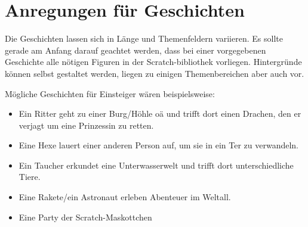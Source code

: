 \section{Anregungen für
Geschichten}\label{anregungen-fuxfcr-geschichten}

Die Geschichten lassen sich in Länge und Themenfeldern variieren. Es
sollte gerade am Anfang darauf geachtet werden, dass bei einer
vorgegebenen Geschichte alle nötigen Figuren in der Scratch-bibliothek
vorliegen. Hintergründe können selbst gestaltet werden, liegen zu
einigen Themenbereichen aber auch vor.

Mögliche Geschichten für Einsteiger wären beispielsweise:

\begin{itemize}
\item
  Ein Ritter geht zu einer Burg/Höhle oä und trifft dort einen Drachen,
  den er verjagt um eine Prinzessin zu retten.
\item
  Eine Hexe lauert einer anderen Person auf, um sie in ein Ter zu
  verwandeln.
\item
  Ein Taucher erkundet eine Unterwasserwelt und trifft dort
  unterschiedliche Tiere.
\item
  Eine Rakete/ein Astronaut erleben Abenteuer im Weltall.
\item
  Eine Party der Scratch-Maskottchen
\end{itemize}

